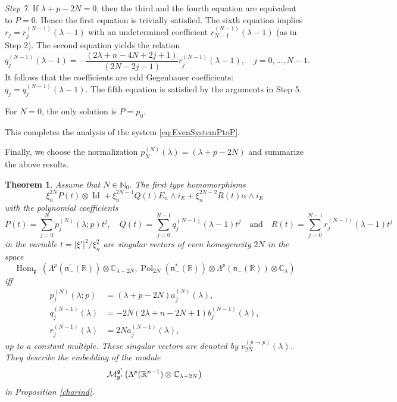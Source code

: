\documentclass[a4paper,12pt,reqno]{amsart}
\newtheorem{theorem}{Theorem}
\numberwithin{theorem}{subsection}
\numberwithin{equation}{section}
\begin{document}
{\em Step 7}. If $\lambda+p-2N=0$, then the third and the fourth equation are
equivalent to $P=0$. Hence the first equation is trivially satisfied. The sixth
equation implies $r_j=r_j^{(N-1)}(\lambda-1)$ with an undetermined coefficient
$r_{N-1}^{(N-1)}(\lambda-1)$ (as in Step 2). The second equation yields the
relation
$$
   q_j^{(N-1)}(\lambda\!-\!1) = -\frac{(2\lambda\!+\!n\!-\!4N\!+\!2j\!+\!1)}{(2N\!-\!2j\!-\!1)}
   r^{(N-1)}_{j}(\lambda\!-\!1), \quad j=0,\dots, N-1.
$$
It follows that the coefficients are odd Gegenbauer coefficients: $q_j =
q_j^{(N-1)}(\lambda\!-\!1)$. The fifth equation is satisfied by the arguments
in Step 5.

For $N=0$, the only solution is $P=p_0$.

This completes the analysis of the system \eqref{eq:EvenSystemPtoP}.

Finally, we choose the normalization $p_N^{(N)}(\lambda) =
(\lambda\!+\!p\!-\!2N)$ and summarize the above results.

\begin{theorem}\label{EvenFromPtoP} Assume that $N \in {\mathbb{N}}_0$. The first type
homomorphisms
\begin{equation*}
   \xi_n^{2N} P(t) \otimes {\operatorname{Id}} + \xi_n^{2N-1} Q(t) E_n \wedge i_E + \xi_n^{2N-2} R(t) \alpha \wedge i_E
\end{equation*}
with the polynomial coefficients
$$
   P(t) = \sum_{j=0}^N p^{(N)}_j(\lambda;p) t^j, \quad
   Q(t) = \sum_{j=0}^{N-1} q^{(N-1)}_j(\lambda\!-\!1) t^j \quad \mbox{and} \quad
   R(t) = \sum_{j=0}^{N-1} r^{(N-1)}_j(\lambda\!-\!1) t^j
$$
in the variable $t = {\lvert{\xi'}\rvert}^2/\xi_n^2$ are singular vectors of even
homogeneity $2N$ in the space
$$
   {\operatorname{Hom}}_{{{\mathfrak p}}^\prime}(\Lambda^{p}({{\mathfrak n}}_-^\prime({\mathbb{R}})) \otimes {\mathbb{C}}_{\lambda-2N},
   {\operatorname{Pol}}_{2N}({{\mathfrak n}}_-^*({\mathbb{R}})) \otimes \Lambda^p({{\mathfrak n}}_-({\mathbb{R}})) \otimes {\mathbb{C}}_\lambda)
$$
iff
\begin{align*}
   p_j^{(N)}(\lambda;p) & = (\lambda\!+\!p\!-\!2N) a_j^{(N)}(\lambda), \\
   q_j^{(N-1)}(\lambda) & = -2N(2\lambda\!+\!n\!-\!2N\!+\!1) b_j^{(N-1)}(\lambda), \\
   r_j^{(N-1)}(\lambda) & = 2N a_j^{(N-1)}(\lambda),
\end{align*}
up to a constant multiple. These singular vectors are denoted by $v^{(p\to
p)}_{2N}(\lambda)$. They describe the embedding of the module
$$
   {\fam2 M}^{{{\mathfrak g}}^\prime}_{{{\mathfrak p}}^\prime} \left(\Lambda^{p}({\mathbb{R}}^{n-1}) \otimes {\mathbb{C}}_{\lambda-2N}\right)
$$
in Proposition \ref{charind}.
\end{theorem}
\end{document}
